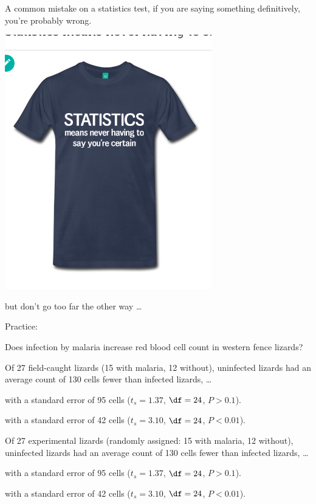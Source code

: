 \begin{frame}{A common mistake}
    on a statistics test, if you are saying something definitively,
    you're probably wrong.

    \begin{center}
        \includegraphics[height=0.7\textwidth]{never-certain}
    \end{center}

    \alert{but} don't go too far the other way \ldots
\end{frame}

\begin{frame}{Practice:}

    \alert{Does infection by malaria increase red blood cell count in western fence lizards?}
    \vfill

    Of \alert{27 field-caught lizards} (15 with malaria, 12 without),
    uninfected lizards had an average count of 130 cells fewer than infected lizards,
    \ldots
    
    \vspace{1em}

    with a standard error of 95 cells ($t_s=1.37$, $\df=24$, $P>0.1$).
    \vspace{1em}

    with a standard error of 42 cells ($t_s=3.10$, $\df=24$, $P<0.01$).
    \vfill

    Of \alert{27 experimental lizards} (randomly assigned: 15 with malaria, 12 without),
    uninfected lizards had an average count of 130 cells fewer than infected lizards,
    \ldots
    \vspace{1em}

    with a standard error of 95 cells ($t_s=1.37$, $\df=24$, $P>0.1$).
    \vspace{1em}

    with a standard error of 42 cells ($t_s=3.10$, $\df=24$, $P<0.01$).
    \vfill

\end{frame}

